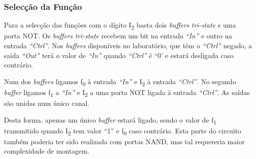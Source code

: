 \documentclass[a4paper,12pt]{article}
\begin{document}
\subsubsection{Selecção da Função}
Para a selecção das funções com o dígito I\textsubscript{2} basta dois 
{\it buffers tri-state} e uma porta NOT. Os {\it buffers tri-state} recebem um 
bit na entrada {\it ``In''} e outro na entrada {\it ``Ctrl''}. Nos {\it 
buffers} disponíveis no laboratório, que têm o {\it ``Ctrl''} negado, a 
saída {\it ``Out''} terá o valor de {\it ``In''} quando {\it ``Ctrl''} é 
``0' e estará desligada caso contrário.
\par
Num dos {\it buffers} ligamos f\textsubscript{0} à entrada {\it ``In''} e 
I\textsubscript{2} à entrada {\it ``Ctrl''}. No segundo {\it buffer} ligamos 
f\textsubscript{1} a {\it ``In''} e I\textsubscript{2} a uma porta NOT ligada 
à entrada {\it ``Ctrl''}. 
As saídas são unidas num único canal. 
\par
Desta forma, apenas um único {\it buffer} estará ligado, sendo o valor de 
f\textsubscript{1} transmitido quando I\textsubscript{2} tem valor ``1'' e 
f\textsubscript{0} caso contrário. Esta parte do circuito também poderia ter 
sido realizada com portas NAND, mas tal requereria maior complexidade de 
montagem.
\par
\end{document}
